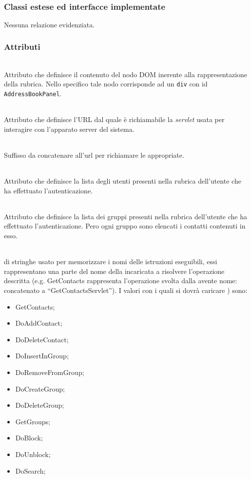 \subsubsection*{Classi estese ed interfacce implementate}
Nessuna relazione evidenziata.

\subsubsection*{Attributi}
\begin{description}

  \item{}\\
  Attributo che definisce il contenuto del nodo DOM inerente alla rappresentazione della rubrica. Nello specifico tale nodo corrisponde ad un \texttt{div} con id \texttt{AddressBookPanel}.
  \item{}\\
  Attributo che definisce l'URL dal quale è richiamabile la \textit{servlet} usata per interagire con l'apparato server del sistema.
  \item{}\\
Suffisso da concatenare all'url per richiamare le  appropriate.  
  \item{}\\
  Attributo che definisce la lista degli utenti presenti nella rubrica dell'utente che ha effettuato l'autenticazione.
   \item{}\\
  Attributo che definisce la lista dei gruppi presenti nella rubrica dell'utente che ha effettuato l'autenticazione. Pero ogni gruppo sono  elencati i contatti contenuti in esso.
   \item{}\\ 
    di stringhe usato per memorizzare i nomi delle istruzioni eseguibili, essi rappresentano una parte del nome della  incaricata a risolvere l'operazione descritta (e.g. GetContacts rappresenta l'operazione svolta dalla  avente nome:  concatenato a ``GetContactsServlet''). I valori con i quali si dovrà caricare ) sono:
   \begin{itemize}
   	\item GetContacts;
    \item DoAddContact;
    \item DoDeleteContact;
    \item DoInsertInGroup;
    \item DoRemoveFromGroup;
    \item DoCreateGroup;
    \item DoDeleteGroup;
    \item GetGroups;
    \item DoBlock;
    \item DoUnblock;
    \item DoSearch;
   \end{itemize}


\end{description}
